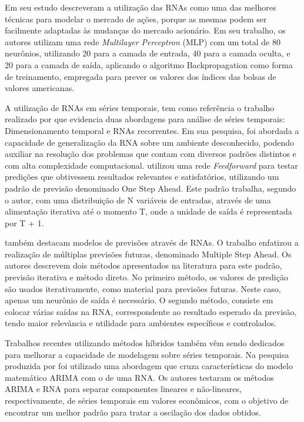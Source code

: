 Em seu estudo  descreveram a utilização das RNAs como uma das melhores técnicas para modelar o mercado de ações, porque as mesmas podem ser facilmente adaptadas às mudanças do mercado acionário. Em seu trabalho, os autores utilizam uma rede \textit{Multilayer Perceptron} (MLP) com um total de 80 neurônios, utilizando 20 para a camada de entrada, 40 para a camada oculta, e 20 para a camada de saída, aplicando o algoritmo Backpropagation como forma de treinamento, empregada para prever os valores dos índices das bolsas de valores americanas.

A utilização de RNAs em séries temporais, tem como referência o trabalho realizado por  que evidencia duas abordagens para análise de séries temporais: Dimensionamento temporal e RNAs recorrentes. Em sua pesquisa, foi abordada a capacidade de generalização da RNA sobre um ambiente desconhecido, podendo auxiliar na resolução dos problemas que contam com diversos padrões distintos e com alta complexidade computacional.  utilizou uma rede \textit{Feedforward} para testar predições que obtivessem resultados relevantes e satisfatórios, utilizando um padrão de previsão denominado One Step Ahead. Este padrão trabalha, segundo o autor, com uma distribuição de  N variáveis de entradas, através de uma alimentação iterativa até o momento T, onde a unidade de saída é representada por T + 1.

 também destacam modelos de previsões através de RNAs. O trabalho enfatizou a realização de múltiplas previsões futuras, denominado Multiple Step Ahead. Os autores descrevem dois métodos apresentados na literatura para  este padrão, previsão iterativa e método direto. No primeiro método, os  valores de predição são usados iterativamente, como material para previsões futuras. Neste caso, apenas um neurônio de saída é necessário. O segundo método, consiste em colocar várias saídas na RNA, correspondente ao resultado esperado da previsão, tendo maior  relevância e utilidade  para ambientes específicos e controlados.

Trabalhos recentes utilizando métodos híbridos também vêm sendo dedicados para melhorar a capacidade de modelagem sobre séries temporais. Na pesquisa produzida por  foi utilizado uma abordagem que cruza características do modelo matemático ARIMA com o de uma RNA. Os autores testaram os métodos ARIMA e RNA para separar componentes lineares e não-lineares, respectivamente, de séries temporais em valores econômicos, com o objetivo de encontrar um melhor padrão para tratar a oscilação dos dados obtidos.

